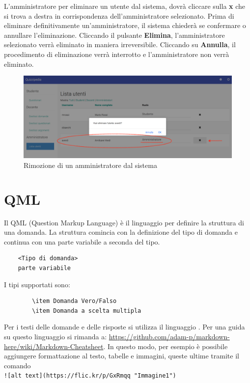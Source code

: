 \documentclass[12pt,a4paper]{article}
\begin{document}
	L'amministratore per eliminare un utente dal sistema, dovrà cliccare sulla \textbf{x} che si trova a destra in corrispondenza dell'amministratore selezionato. Prima di eliminare definitivamente un'amministratore, il sistema chiederà se confermare o annullare l'eliminazione. Cliccando il pulsante \textbf{Elimina}, l'amministratore selezionato verrà eliminato in maniera irreversibile. Cliccando su \textbf{Annulla}, il procedimento di eliminazione verrà interrotto e l'amministratore non verrà eliminato.
		\begin{figure}[H]
			\centering
			\includegraphics[width=1\linewidth]{../img/screenshot/rimozioneAmministratore.png}
			\caption{Rimozione di un amministratore dal sistema}
			\label{Rimozione di un amministratore dal sistema}
		\end{figure}
	
	\section{QML}
	Il QML (Question Markup Language) è il linguaggio per definire la struttura di una domanda. La struttura comincia con la definizione del tipo di domanda e continua con una parte variabile a seconda del tipo.\\
	\begin{verbatim}
	<Tipo di domanda>
	parte variabile
	\end{verbatim}
		
	 I tipi supportati sono:
	\begin{verbatim}
		\item Domanda Vero/Falso
		\item Domanda a scelta multipla
	\end{verbatim}
	Per i testi delle domande e delle risposte si utilizza il linguaggio . Per una guida su questo linguaggio si rimanda a: \url{https://github.com/adam-p/markdown-here/wiki/Markdown-Cheatsheet}. In questo modo, per esempio è possibile aggiungere formattazione al testo, tabelle e immagini, queste ultime tramite il comando\\
	 \texttt{![alt text](https://flic.kr/p/GxRmqq "Immagine1")}\\
	 
\end{document}
